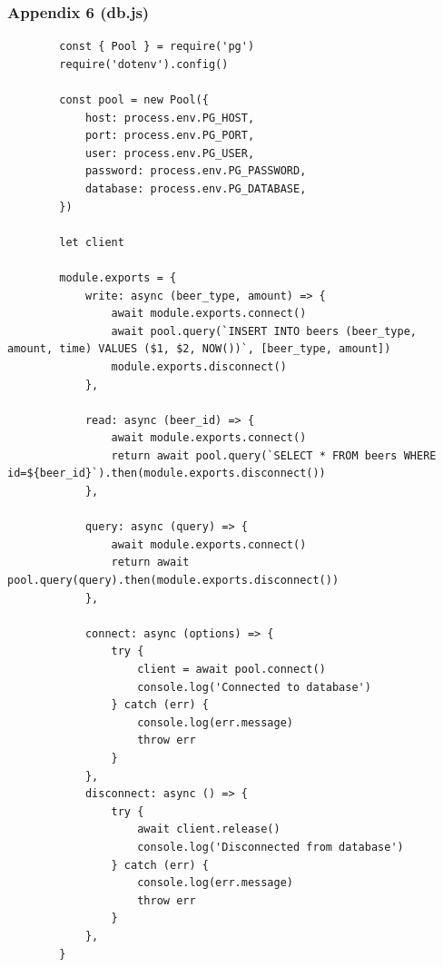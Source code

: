 \subsubsection{Appendix 6 (db.js)}
\begin{center}
    \begin{verbatim}
        const { Pool } = require('pg')
        require('dotenv').config()

        const pool = new Pool({
            host: process.env.PG_HOST,
            port: process.env.PG_PORT,
            user: process.env.PG_USER,
            password: process.env.PG_PASSWORD,
            database: process.env.PG_DATABASE,
        })

        let client

        module.exports = {
            write: async (beer_type, amount) => {
                await module.exports.connect()
                await pool.query(`INSERT INTO beers (beer_type, amount, time) VALUES ($1, $2, NOW())`, [beer_type, amount])
                module.exports.disconnect()
            },

            read: async (beer_id) => {
                await module.exports.connect()
                return await pool.query(`SELECT * FROM beers WHERE id=${beer_id}`).then(module.exports.disconnect())
            },

            query: async (query) => {
                await module.exports.connect()
                return await pool.query(query).then(module.exports.disconnect())
            },

            connect: async (options) => {
                try {
                    client = await pool.connect()
                    console.log('Connected to database')
                } catch (err) {
                    console.log(err.message)
                    throw err
                }
            },
            disconnect: async () => {
                try {
                    await client.release()
                    console.log('Disconnected from database')
                } catch (err) {
                    console.log(err.message)
                    throw err
                }
            },
        }
    \end{verbatim}
\end{center}